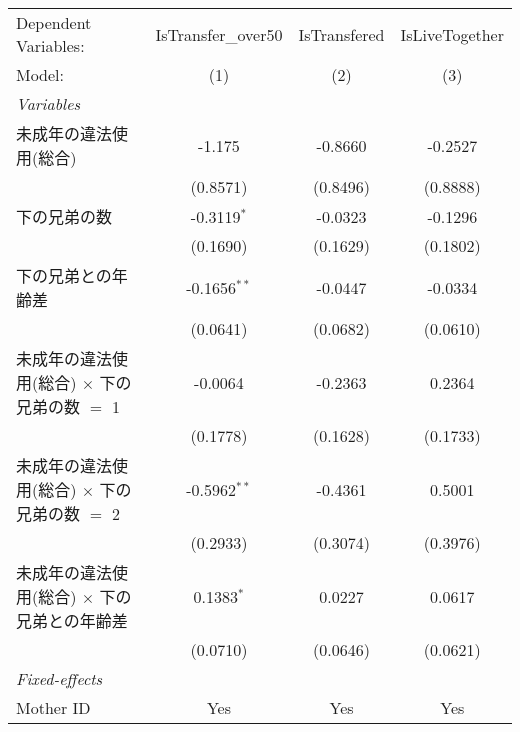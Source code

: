 \documentclass{article}
\begin{document}
\begin{landscape}


\begingroup
\centering
\begin{threeparttable}[b]
   \begin{tabular}{lccc}
      \tabularnewline \midrule \midrule
      Dependent Variables:                                & IsTransfer\_over50  & IsTransfered & IsLiveTogether\\  
      Model:                                              & (1)                 & (2)          & (3)\\  
      \midrule
      \emph{Variables}\\
      未成年の違法使用(総合)                              & -1.175              & -0.8660      & -0.2527\\   
                                                          & (0.8571)            & (0.8496)     & (0.8888)\\   
      下の兄弟の数                                        & -0.3119$^{*}$       & -0.0323      & -0.1296\\   
                                                          & (0.1690)            & (0.1629)     & (0.1802)\\   
      下の兄弟との年齢差                                  & -0.1656$^{**}$      & -0.0447      & -0.0334\\   
                                                          & (0.0641)            & (0.0682)     & (0.0610)\\   
      未成年の違法使用(総合) $\times$ 下の兄弟の数 $=$ 1  & -0.0064             & -0.2363      & 0.2364\\   
                                                          & (0.1778)            & (0.1628)     & (0.1733)\\   
      未成年の違法使用(総合) $\times$ 下の兄弟の数 $=$ 2  & -0.5962$^{**}$      & -0.4361      & 0.5001\\   
                                                          & (0.2933)            & (0.3074)     & (0.3976)\\   
      未成年の違法使用(総合) $\times$ 下の兄弟との年齢差  & 0.1383$^{*}$        & 0.0227       & 0.0617\\   
                                                          & (0.0710)            & (0.0646)     & (0.0621)\\   
      \midrule
      \emph{Fixed-effects}\\
      Mother ID                                           & Yes                 & Yes          & Yes\\  

\end{tabular}
\end{threeparttable}
\end{landscape}
\end{document}
